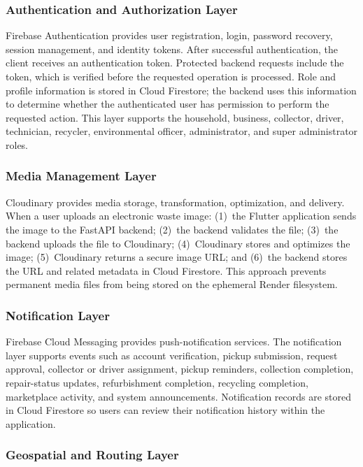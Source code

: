 \subsubsection{Authentication and Authorization Layer}

Firebase Authentication provides user registration, login, password recovery,
session management, and identity tokens. After successful authentication, the
client receives an authentication token. Protected backend requests include the
token, which is verified before the requested operation is processed. Role and
profile information is stored in Cloud Firestore; the backend uses this
information to determine whether the authenticated user has permission to
perform the requested action. This layer supports the household, business,
collector, driver, technician, recycler, environmental officer, administrator, and
super administrator roles.

\subsubsection{Media Management Layer}

Cloudinary provides media storage, transformation, optimization, and
delivery. When a user uploads an electronic waste image: (1)~the Flutter
application sends the image to the FastAPI backend; (2)~the backend validates
the file; (3)~the backend uploads the file to Cloudinary; (4)~Cloudinary stores
and optimizes the image; (5)~Cloudinary returns a secure image URL; and
(6)~the backend stores the URL and related metadata in Cloud Firestore. This
approach prevents permanent media files from being stored on the ephemeral
Render filesystem.

\subsubsection{Notification Layer}

Firebase Cloud Messaging provides push-notification services. The
notification layer supports events such as account verification, pickup
submission, request approval, collector or driver assignment, pickup
reminders, collection completion, repair-status updates, refurbishment
completion, recycling completion, marketplace activity, and system
announcements. Notification records are stored in Cloud Firestore so users can
review their notification history within the application.

\subsubsection{Geospatial and Routing Layer}

